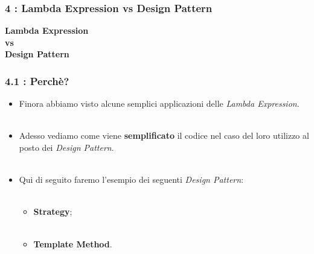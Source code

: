 \documentclass{beamer}
\begin{document}
\begin{frame}
	\frametitle{\textbf{4 : Lambda Expression vs Design Pattern}}
	\begin{center}
		\textbf{\Huge Lambda Expression\\ vs\\ Design Pattern}
	\end{center}
\end{frame}


\begin{frame}[fragile]
	\frametitle{\textbf{4.1 : Perchè?}}
	\begin{itemize}
		\item
			Finora abbiamo visto alcune semplici applicazioni delle \textit{Lambda Expression}.\\\
		\item
			Adesso vediamo come viene \textbf{semplificato} il codice nel caso del loro utilizzo al posto dei \textit{Design Pattern}.\\\
		\item
			Qui di seguito faremo l'esempio dei seguenti \textit{Design Pattern}:\\\
			\begin{itemize}
				\item
					\textbf{Strategy};\\\
				\item
					\textbf{Template Method}.
			\end{itemize}
	\end{itemize}
\end{frame}

\end{document}
